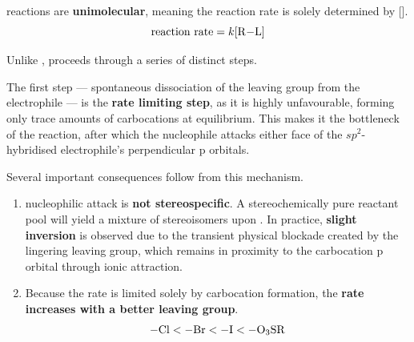 \documentclass[10pt]{article}
\begin{document}
  \begin{core}{\sno}

    \sno reactions are \textbf{unimolecular}, meaning the reaction rate is solely determined by [].
    \[
      \text{reaction rate} = k[\ce{R-L}]
    \]

    Unlike \snt, \sno proceeds through a series of distinct steps.
    

    The first step --- spontaneous dissociation of the leaving group from the electrophile --- is the \textbf{rate limiting step}, as it is highly unfavourable, forming only trace amounts of carbocations at equilibrium. This makes it the bottleneck of the reaction, after which the nucleophile attacks either face of the $sp^2$-hybridised electrophile's perpendicular p orbitals.

    Several important consequences follow from this mechanism.

    \begin{enumerate}

      \item \sno nucleophilic attack is \textbf{not stereospecific}. A stereochemically pure reactant pool will yield a mixture of stereoisomers upon \sno. In practice, \textbf{slight inversion} is observed due to the transient physical blockade created by the lingering leaving group, which remains in proximity to the carbocation p orbital through ionic attraction.

      \item Because the rate is limited solely by carbocation formation, the \textbf{rate increases with a better leaving group}.
      \[
        \ce{-Cl} < \ce{-Br} < \ce{-I} < \ce{-O3SR}
      \]


\end{enumerate}
\end{core}
\end{document}
